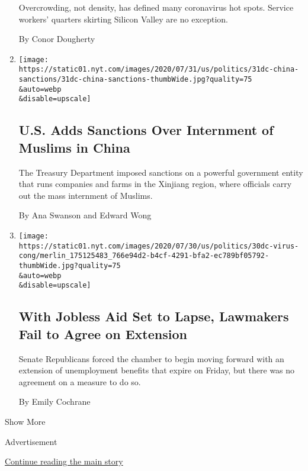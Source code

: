 \begin{enumerate}
  Overcrowding, not density, has defined many coronavirus hot spots.
  Service workers' quarters skirting Silicon Valley are no exception.

  By Conor Dougherty
\item
  \href{/2020/07/31/us/politics/sanctions-china-xinjiang-uighurs.html}{}

  \texttt{[image: https://static01.nyt.com/images/2020/07/31/us/politics/31dc-china-sanctions/31dc-china-sanctions-thumbWide.jpg?quality=75\\\&auto=webp\\\&disable=upscale]}

  \hypertarget{us-adds-sanctions-over-internment-of-muslims-in-china}{%
  \subsection{U.S. Adds Sanctions Over Internment of Muslims in
  China}\label{us-adds-sanctions-over-internment-of-muslims-in-china}}

  The Treasury Department imposed sanctions on a powerful government
  entity that runs companies and farms in the Xinjiang region, where
  officials carry out the mass internment of Muslims.

  By Ana Swanson and Edward Wong
\item
  \href{/2020/07/30/us/politics/senate-virus-aid.html}{}

  \texttt{[image: https://static01.nyt.com/images/2020/07/30/us/politics/30dc-virus-cong/merlin\_175125483\_766e94d2-b4cf-4291-bfa2-ec789bf05792-thumbWide.jpg?quality=75\\\&auto=webp\\\&disable=upscale]}

  \hypertarget{with-jobless-aid-set-to-lapse-lawmakers-fail-to-agree-on-extension}{%
  \subsection{With Jobless Aid Set to Lapse, Lawmakers Fail to Agree on
  Extension}\label{with-jobless-aid-set-to-lapse-lawmakers-fail-to-agree-on-extension}}

  Senate Republicans forced the chamber to begin moving forward with an
  extension of unemployment benefits that expire on Friday, but there
  was no agreement on a measure to do so.

  By Emily Cochrane
\end{enumerate}

Show More

Advertisement

\protect\hyperlink{after-mid1}{Continue reading the main story}


